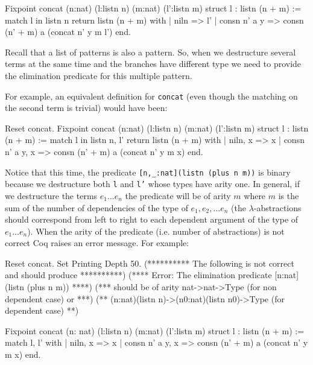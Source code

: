\begin{coq_example}
Fixpoint concat (n:nat) (l:listn n) (m:nat) (l':listn m) {struct l} :
 listn (n + m) :=
  match l in listn n return listn (n + m) with
  | niln => l'
  | consn n' a y => consn (n' + m) a (concat n' y m l')
  end.
\end{coq_example}

Recall that a list of patterns is also a pattern. So, when
we destructure several terms at the same time and the branches have
different type  we need to provide
the elimination predicate for this multiple pattern.

For example, an equivalent definition for \texttt{concat} (even though the matching on the second term is trivial) would have
been:

\begin{coq_example}
Reset concat.
Fixpoint concat (n:nat) (l:listn n) (m:nat) (l':listn m) {struct l} :
 listn (n + m) :=
  match l in listn n, l' return listn (n + m) with
  | niln, x => x
  | consn n' a y, x => consn (n' + m) a (concat n' y m x)
  end.
\end{coq_example}

Notice that this time, the predicate \texttt{[n,\_:nat](listn (plus n
  m))}  is binary because we
destructure both \texttt{l} and \texttt{l'} whose types have arity one.
In general, if we destructure the terms $e_1\ldots e_n$
the predicate will be of arity $m$ where $m$ is the sum of the
number of dependencies of the type of $e_1, e_2,\ldots e_n$ 
(the $\lambda$-abstractions
should correspond from left to right to each dependent argument of the
type of $e_1\ldots e_n$).
When the arity of the predicate (i.e. number of abstractions) is not
correct Coq raises an error message. For example:

\begin{coq_eval}
Reset concat.
Set Printing Depth 50.
(********** The following is not correct and should produce **********)
(**** Error: The elimination predicate [n:nat](listn (plus n m))  ****)
(*** should be of arity nat->nat->Type (for non dependent case) or ***)
(** (n:nat)(listn n)->(n0:nat)(listn n0)->Type (for dependent case) **)
\end{coq_eval}

\begin{coq_example}
Fixpoint concat
 (n: nat) (l:listn n) (m:nat) (l':listn m) {struct l} : listn (n + m) :=
  match l, l' with
  | niln, x => x
  | consn n' a y, x => consn (n' + m) a (concat n' y m x)
  end.
\end{coq_example}

